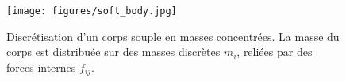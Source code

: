 \begin{figure}[h]
    \centering
    \texttt{[image: figures/soft\_body.jpg]}
    \caption{Discr\'etisation d’un corps souple en masses concentr\'ees. La masse du corps est distribu\'ee sur des masses discr\`etes $m_i$, reli\'ees par des forces internes $f_{ij}$.}
    \label{fig:soft_body}
\end{figure}